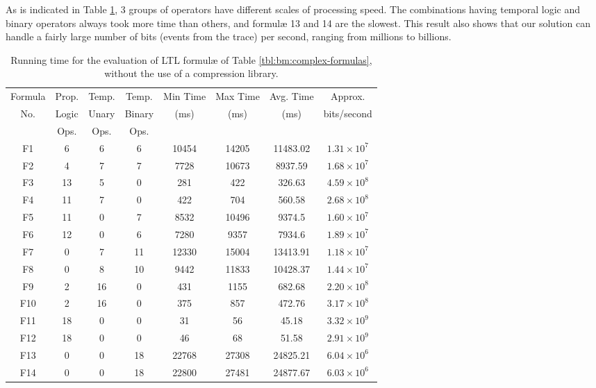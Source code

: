 As is indicated in Table \ref{tbl:bm:complex}, 3 groups of operators have different scales of processing speed. The combinations having temporal logic and binary operators always took more time than others, and formul\ae{} 13 and 14 are the slowest. This result also shows that our solution can handle a fairly large number of bits (events from the trace) per second, ranging from millions to billions.

\begin{table}[h]
\centering
\small
\begin{tabular}{|c|c|c|c|c|c|c|c|}
\hline
Formula & Prop. & Temp. & Temp. & Min Time & Max Time & Avg. Time & Approx. \\
No. & Logic & Unary & Binary & (ms) & (ms) & (ms) & bits/second \\
& Ops. & Ops. & Ops. & & & & \\
\hline
F1 & 6 & 6 & 6 & 10454 & 14205 & 11483.02 & $1.31 \times 10^7$ \\
\hline
F2 & 4 & 7 & 7 & 7728 & 10673 & 8937.59 & $1.68 \times 10^7$  \\
\hline
F3 & 13 & 5 & 0 & 281 & 422 & 326.63 & $4.59 \times 10^8$  \\
\hline
F4 & 11 & 7 & 0 & 422 & 704 & 560.58 & $2.68 \times 10^8$  \\
\hline
F5 & 11 & 0 & 7 & 8532 & 10496 & 9374.5 & $1.60 \times 10^7$  \\
\hline
F6 & 12 & 0 & 6 & 7280 & 9357 & 7934.6 & $1.89 \times 10^7$  \\
\hline
F7 & 0 & 7 & 11 & 12330 & 15004 & 13413.91 & $1.18 \times 10^7$  \\
\hline
F8 & 0 & 8 & 10 & 9442 & 11833 & 10428.37 & $1.44 \times 10^7$  \\
\hline
F9 & 2 & 16 & 0 & 431 & 1155 & 682.68 & $2.20 \times 10^8$  \\
\hline
F10 & 2 & 16 & 0 & 375 & 857 & 472.76 & $3.17 \times 10^8$  \\
\hline
F11 & 18 & 0 & 0 & 31 & 56 & 45.18 & $3.32 \times 10^9$  \\
\hline
F12 & 18 & 0 & 0 & 46 & 68 & 51.58 & $2.91 \times 10^9$  \\
\hline
F13 & 0 & 0 & 18 & 22768 & 27308 & 24825.21 & $6.04 \times 10^6$  \\
\hline
F14 & 0 & 0 & 18 & 22800 & 27481 & 24877.67 & $6.03 \times 10^6$  \\
\hline
\end{tabular}
\vskip 8pt
\caption{Running time for the evaluation of LTL formul\ae{} of Table \ref{tbl:bm:complex-formulas}, without the use of a compression library.}
\label{tbl:bm:complex}
\end{table}

